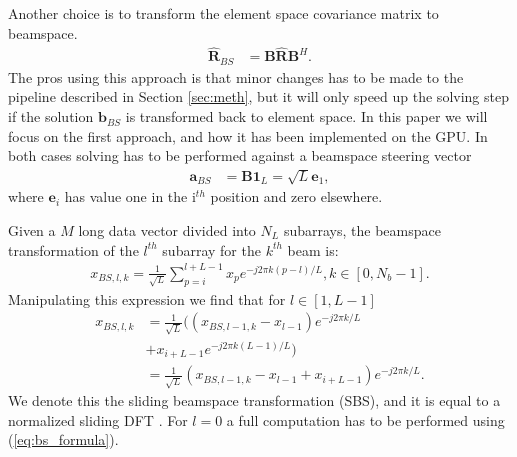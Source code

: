 \documentclass[12pt,journal,onecolumn]{IEEEtran}
\newcommand{\mat}[1]{\mathbf{#1}}
\renewcommand{\vec}[1]{\mathbf{#1}}
\begin{document}
Another choice is to transform the element space covariance matrix to beamspace. 
\begin{align}
\mat{\hat{R}}_{BS} &= \mat{B}\mat{\hat{R}}\mat{B}^H.
\end{align}
The pros using this approach is that minor changes has to be made to the pipeline described in Section \ref{sec:meth}, but it will only speed up the solving step if the solution $\vec{b}_{BS}$ is transformed back to element space. In this paper we will focus on the first approach, and how it has been implemented on the GPU.
In both cases solving has to be performed against a beamspace steering vector
\begin{align}
\vec{a}_{BS} &= \mat{B}\vec{1}_L = \sqrt{L}\vec{e}_1,
\end{align}
where $\vec{e}_i$ has value one in the i$^{th}$ position and zero elsewhere.

Given a $M$ long data vector divided into $N_L$ subarrays, the beamspace transformation of the $l^{th}$ subarray for the $k^{th}$ beam is:
\begin{align}\label{eq:bs_formula}
x_{BS,l,k} = \frac{1}{\sqrt{L}}\sum_{p=i}^{l+L-1}x_p e^{-j2\pi k(p-l)/L} , k \in [0, N_b-1].
\end{align}
Manipulating this expression we find that for $l \in [1, L-1]$
\begin{align}\label{eq:sliding_bs}
x_{BS,l,k} &= \frac{1}{\sqrt{L}}((x_{BS,l-1,k} - x_{l-1})e^{-j2\pi k/L} \nonumber \\ &+ x_{i+L-1}e^{-j2\pi k(L-1)/L}) \nonumber \\
&= \frac{1}{\sqrt{L}}(x_{BS,l-1,k} - x_{l-1} + x_{i+L-1})e^{-j2\pi k/L}.
\end{align}
We denote this the sliding beamspace transformation (SBS), and it is equal to a normalized sliding DFT \cite{Lyons2003}. For $l=0$ a full computation has to be performed using (\ref{eq:bs_formula}).
\end{document}

